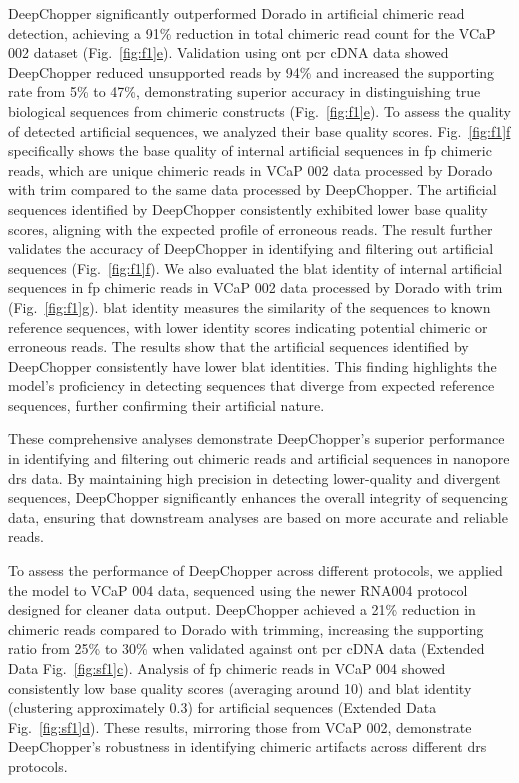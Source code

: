 \documentclass[pdflatex, sn-mathphys-num, lineno]{sn-jnl}%
\newcommand{\figref}[2]{Fig.~\hyperref[#1]{\ref*{#1}#2}}
\newcommand{\edfigref}[2]{Extended Data Fig.~\hyperref[#1]{\ref*{#1}#2}}
\theoremstyle{thmstyleone}%
\theoremstyle{thmstyletwo}%
\theoremstyle{thmstylethree}%
\begin{document}
DeepChopper significantly outperformed Dorado in artificial chimeric read detection, achieving a 91\% reduction in total chimeric read count for the VCaP 002 dataset (\figref{fig:f1}{e}).
Validation using \gls{ont} \gls{pcr} cDNA data showed DeepChopper reduced unsupported reads by 94\% and increased the supporting rate from 5\% to 47\%, demonstrating superior accuracy in distinguishing true biological sequences from chimeric constructs (\figref{fig:f1}{e}).
To assess the quality of detected artificial sequences, we analyzed their base quality scores. \figref{fig:f1}{f} specifically shows the base quality of internal artificial sequences in \gls{fp} chimeric reads, which are unique chimeric reads in VCaP 002 data processed by Dorado with trim compared to the same data processed by DeepChopper.
The artificial sequences identified by DeepChopper consistently exhibited lower base quality scores, aligning with the expected profile of erroneous reads.
The result further validates the accuracy of DeepChopper in identifying and filtering out artificial sequences (\figref{fig:f1}{f}).
We also evaluated the \gls{blat} identity of internal artificial sequences in \gls{fp} chimeric reads in VCaP 002 data processed by Dorado with trim  (\figref{fig:f1}{g}).
\gls{blat} identity measures the similarity of the sequences to known reference sequences, with lower identity scores indicating potential chimeric or erroneous reads.
The results show that the artificial sequences identified by DeepChopper consistently have lower \gls{blat} identities.
This finding highlights the model's proficiency in detecting sequences that diverge from expected reference sequences, further confirming their artificial nature.

These comprehensive analyses demonstrate DeepChopper's superior performance in identifying and filtering out chimeric reads and artificial sequences in nanopore \gls{drs} data.
By maintaining high precision in detecting lower-quality and divergent sequences, DeepChopper significantly enhances the overall integrity of sequencing data, ensuring that downstream analyses are based on more accurate and reliable reads.

To assess the performance of DeepChopper across different protocols, we applied the model to VCaP 004 data, sequenced using the newer RNA004 protocol designed for cleaner data output.
DeepChopper achieved a 21\% reduction in chimeric reads compared to Dorado with trimming, increasing the supporting ratio from 25\% to 30\% when validated against \gls{ont} \gls{pcr} cDNA data (\edfigref{fig:sf1}{c}).
Analysis of \gls{fp} chimeric reads in VCaP 004 showed consistently low base quality scores (averaging around 10) and \gls{blat} identity (clustering approximately 0.3) for artificial sequences (\edfigref{fig:sf1}{d}).
These results, mirroring those from VCaP 002, demonstrate DeepChopper's robustness in identifying chimeric artifacts across different \gls{drs} protocols.
\end{document}
